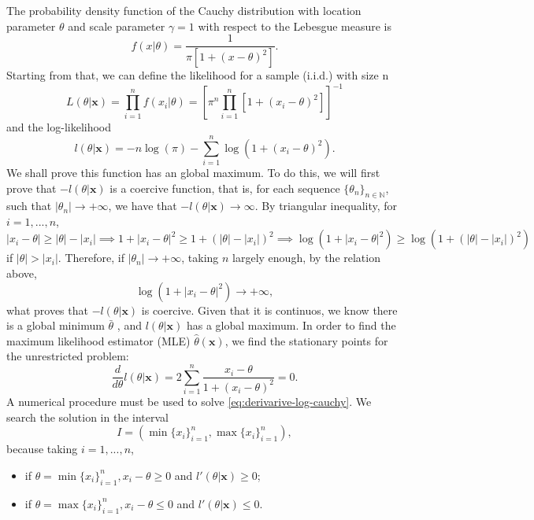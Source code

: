 \documentclass[a4paper,10pt, notitlepage]{report}
\theoremstyle{plain}
\newcommand{\bx}{\boldsymbol{x}} %
\begin{document}
The probability density function of the Cauchy distribution with location
parameter $\theta$ and scale parameter $\gamma=1$ with respect to the Lebesgue
measure is 
    \begin{equation}
        \label{eq:pdf-cauchy}
        f(x|\theta) = \frac{1}{\pi[1 + (x - \theta)^2]}.
    \end{equation} 
    Starting from that, we can define the likelihood for a sample (i.i.d.)
    with size n
    \begin{equation}
        \label{eq:likelihood-cauchy}
        L(\theta|\bx) = \prod_{i=1}^{n} f(x_i|\theta) = \left[\pi^{n}\prod_{i=1}^{n}[1 + (x_i - \theta)^2]\right]^{-1}
    \end{equation}
    and the log-likelihood
    \begin{equation}
        \label{eq:loglikelihood-cauchy}
        l(\theta|\bx) = -n\log(\pi) - \sum_{i=1}^{n}\log\left(1 + (x_i - \theta)^2\right).
    \end{equation}
    We shall prove this function has an global maximum. To do this, we will
    first prove that $-l(\theta|\bx)$ is a coercive function, that is, for each
    sequence $\{\theta_n\}_{n\in\mathbb{N}}$, such that $|\theta_n| \to +
    \infty$, we have that $-l(\theta|\bx) \to \infty$. By triangular
    inequality, for $i=1,...,n$,
    $$|x_i - \theta| \ge |\theta| - |x_i| \implies 1 + |x_i - \theta|^2 \ge
    1 + (|\theta| - |x_i|)^2 \implies \log(1 + |x_i - \theta|^2) \ge
    \log(1 + (|\theta| - |x_i|)^2)$$
    if $|\theta| > |x_i|$.  Therefore, if $|\theta_n| \to + \infty$, taking
    $n$ largely enough, by the relation above, 
    $$
    \log(1 + |x_i - \theta|^2) \to + \infty,
    $$
    what proves that $-l(\theta|\bx)$ is coercive. Given that it is continuos,
    we know there is a global minimum $\bar{\theta}$ \cite[Corolary
    1.2.8]{otimizacao}, and $l(\theta|\bx)$ has a global maximum. 
    In order to find the maximum likelihood estimator (MLE) $\hat{\theta}(\bx)$, we find the
    stationary points for the unrestricted problem: 
    \begin{equation}
        \label{eq:derivarive-log-cauchy}
        \frac{d}{d\theta}l(\theta|\bx) = 2\sum_{i=1}^{n} \frac{x_i-\theta}{1 + (x_i - \theta)^2} = 0.
    \end{equation}
    A numerical procedure must be used to solve
    \ref{eq:derivarive-log-cauchy}. We search the
    solution in the interval 
    $$I = (\min\{x_i\}_{i=1}^{n}, \max\{x_i\}_{i=1}^{n}),$$
    because taking $i=1,...,n$, 
    \begin{itemize}
        \item if $\theta = \min\{x_i\}_{i=1}^{n}, x_i -
        \theta \ge 0$ and $l'(\theta|\bx) \ge 0$;
        \item if $\theta =
        \max\{x_i\}_{i=1}^{n}, x_i - \theta \le 0$ and $l'(\theta|\bx) \le 0$.
    \end{itemize} 
\end{document}
